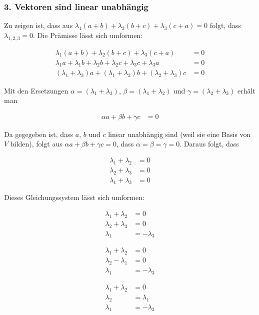 \documentclass[a4paper,german,12pt,smallheadings]{scrartcl}
\begin{document}
\subsubsection*{3. Vektoren sind linear unabhängig}

Zu zeigen ist, dass aus $\lambda_1 (a+b) + \lambda_2 (b+c) + \lambda_3 (c+a) =
0$ folgt, dass $\lambda_{1,2,3} = 0$. Die Prämisse lässt sich umformen:

\begin{align*}
  \lambda_1 (a+b) + \lambda_2 (b+c) + \lambda_3 (c+a) &= 0 \\
  \lambda_1 a + \lambda_1 b + \lambda_2 b + \lambda_2 c + \lambda_3 c + \lambda_3 a &= 0 \\
  (\lambda_1 + \lambda_3) a + (\lambda_1 + \lambda_2) b + (\lambda_2 + \lambda_3) c &= 0
\end{align*}

Mit den Ersetzungen $\alpha = (\lambda_1 + \lambda_3)$, $\beta = (\lambda_1 +
\lambda_2)$ und $\gamma = (\lambda_2 + \lambda_3)$ erhält man

\begin{align*}
  \alpha a + \beta b + \gamma c &= 0
\end{align*}

Da gegegeben ist, dass $a$, $b$ und $c$ linear unabhängig sind (weil sie eine
Basis von $V$ bilden), folgt aus $\alpha a + \beta b + \gamma c = 0$, dass $\alpha =
\beta = \gamma = 0$. Daraus folgt, dass

\begin{align*}
  \lambda_1 + \lambda_2 &= 0 \\
  \lambda_2 + \lambda_3 &= 0 \\
  \lambda_1 + \lambda_3 &= 0
\end{align*}

Dieses Gleichungssystem lässt sich umformen:

\begin{align*}
  \lambda_1 + \lambda_2 &= 0 \\
  \lambda_2 + \lambda_3 &= 0 \\
  \lambda_1 &= -\lambda_3
\end{align*}

\begin{align*}
  \lambda_1 + \lambda_2 &= 0 \\
  \lambda_2 - \lambda_1 &= 0 \\
  \lambda_1 &= -\lambda_3
\end{align*}

\begin{align*}
  \lambda_1 + \lambda_2 &= 0 \\
  \lambda_2 &= \lambda_1 \\
  \lambda_1 &= -\lambda_3
\end{align*}
\end{document}
